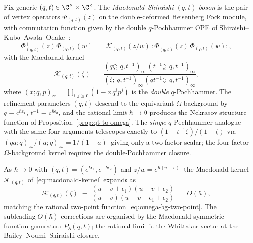 \begin{definition}
\label{def:macdonald-shiraishi-bosons}
Fix generic $(q, t) \in \C^\times \times \C^\times$. The
\emph{Macdonald--Shiraishi $(q, t)$-boson} is the pair of vertex
operators $\Phi_{(q, t)}^\pm(z)$ on the double-deformed Heisenberg
Fock module, with commutation function given by the double
$q$-Pochhammer OPE of
Shiraishi--Kubo--Awata--Odake~\cite{ShiraishiKuboAwataOdake1996}:
\begin{equation}\label{eq:macdonald-shiraishi-ope}
 \Phi_{(q, t)}^+(z)\, \Phi_{(q, t)}^-(w)
 \;=\;
 \mathcal{K}_{(q, t)}(z/w)
 \,:\!\Phi_{(q, t)}^+(z)\, \Phi_{(q, t)}^-(w)\!:,
\end{equation}
with the Macdonald kernel
\begin{equation}\label{eq:macdonald-kernel}
 \mathcal{K}_{(q, t)}(\zeta)
 \;=\;
 \frac{(q\zeta;\, q, t^{-1})_\infty\,(t^{-1}\zeta;\, q, t^{-1})_\infty}
 {(\zeta;\, q, t^{-1})_\infty\,(qt^{-1}\zeta;\, q, t^{-1})_\infty},
\end{equation}
where $(x; q, p)_\infty = \prod_{i, j \geq 0}(1 - x\, q^i p^j)$ is
the \emph{double} $q$-Pochhammer. The refinement parameters $(q, t)$
descend to the equivariant $\Omega$-background by
$q = e^{\hbar \epsilon_1}$, $t^{-1} = e^{\hbar \epsilon_2}$, and the
rational limit $\hbar \to 0$ produces the Nekrasov structure
function of Proposition~\ref{prop:qt-to-omega}. The \emph{single}
$q$-Pochhammer analogue with the same four arguments telescopes
exactly to $(1 - t^{-1}\zeta)/(1 - \zeta)$ via
$(qa; q)_\infty / (a; q)_\infty = 1/(1-a)$, giving only a two-factor
scalar; the four-factor $\Omega$-background kernel requires the
double-Pochhammer closure.
\end{definition}

\begin{proposition}
\label{prop:qt-to-omega}
As $\hbar \to 0$ with $(q, t) = (e^{\hbar \epsilon_1}, e^{-\hbar \epsilon_2})$
and $z/w = e^{\hbar(u - v)}$, the Macdonald kernel
$\mathcal{K}_{(q, t)}$ of~\eqref{eq:macdonald-kernel} expands as
\[
 \mathcal{K}_{(q, t)}(\zeta)
 \;=\;
 \frac{(u - v + \epsilon_1)(u - v + \epsilon_2)}
 {(u - v)(u - v + \epsilon_1 + \epsilon_2)}
 \;+\; O(\hbar),
\]
matching the rational two-point
function~\eqref{eq:omega-bg-two-point}. The subleading $O(\hbar)$
corrections are organised by the Macdonald symmetric-function
generators $P_\lambda(q, t)$; the rational limit is the Whittaker
vector at the Bailey--Noumi--Shiraishi closure.
\end{proposition}

